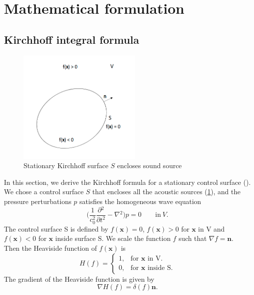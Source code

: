 \documentclass[12pt]{article}
\begin{document}
\section{Mathematical formulation}
\subsection{Kirchhoff integral formula}
\begin{figure}[h!]\label{Kirchhoff}
	\centering
	\includegraphics[width=60mm]{images/kirchhoff_surface.png}
	\caption{Stationary Kirchhoff surface $S$ encloses sound source}
\end{figure}
In this section, we derive the Kirchhoff formula for a stationary control surface (\cite{FARASSAT1988451}). We chose a control surface $S$ that encloses all the acoustic sources (\ref{Kirchhoff}), and the pressure perturbations $p$ satisfies the homogeneous wave equation
\begin{equation}\label{Wave equation}
	\Bigg( \frac{1}{c_{0}^2}\frac{\partial{}^{2}}{\partial{t}^{2}}- \nabla{}^{2} \Bigg) p = 0 \quad \quad \textrm{in} \ V.
\end{equation}
The control surface S is defined by $f(\mathbf{x}) = 0$, $f(\mathbf{x}) > 0$ for $\mathbf{x}$ in V and $f(\mathbf{x}) < 0$ for $\mathbf{x}$ inside surface S. We scale the function $f$ such that $\nabla f = \mathbf{n}$. Then the Heaviside function of $f(\mathbf{x})$    is
\begin{equation}\label{Heaviside}
	H(f) =\begin{cases}
		1, & \text{for $\mathbf{x}$ in V}.     \\
		0, & \text{for $\mathbf{x}$ inside S}.
	\end{cases}
\end{equation}
The gradient of the Heaviside function is given by
\begin{equation}\label{Gradient Heaviside}
	\nabla H(f) = \delta (f) \mathbf{n}.
\end{equation}
\end{document}
